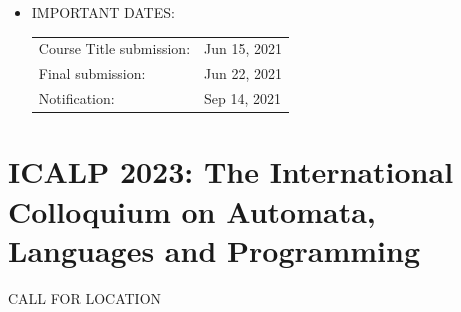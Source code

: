 \documentclass[prodmode,acmtecs]{acmsmall} %
\begin{document}
\begin{itemize}
\item  IMPORTANT DATES: 
 
\begin{tabulary}{\linewidth}{LL}Course Title submission:  & Jun 15, 2021 \\
Final submission:  & Jun 22, 2021 \\
Notification:  & Sep 14, 2021 \\
\end{tabulary}
 
\end{itemize}\section{ICALP 2023: The International Colloquium on Automata, Languages and Programming}\label{ICALP2023}CALL FOR LOCATION 
\end{document}
